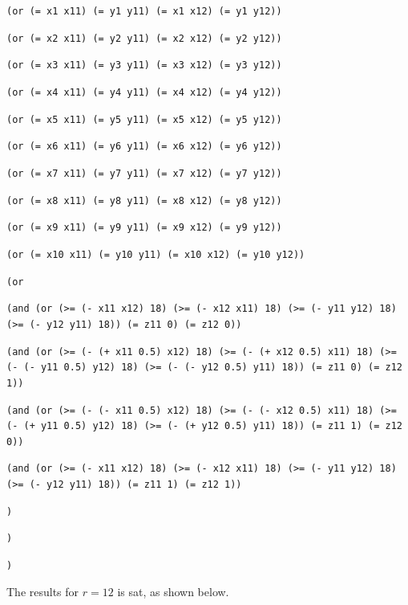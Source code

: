 \documentclass[12pt]{article}
\begin{document}
{{\tt  }

{\tt (or (= x1 x11) (= y1 y11) (= x1 x12) (= y1 y12)) }

{\tt (or (= x2 x11) (= y2 y11) (= x2 x12) (= y2 y12)) }

{\tt (or (= x3 x11) (= y3 y11) (= x3 x12) (= y3 y12)) }

{\tt (or (= x4 x11) (= y4 y11) (= x4 x12) (= y4 y12)) }

{\tt (or (= x5 x11) (= y5 y11) (= x5 x12) (= y5 y12)) }

{\tt (or (= x6 x11) (= y6 y11) (= x6 x12) (= y6 y12)) }

{\tt (or (= x7 x11) (= y7 y11) (= x7 x12) (= y7 y12)) }

{\tt (or (= x8 x11) (= y8 y11) (= x8 x12) (= y8 y12)) }

{\tt (or (= x9 x11) (= y9 y11) (= x9 x12) (= y9 y12)) }

{\tt (or (= x10 x11) (= y10 y11) (= x10 x12) (= y10 y12)) }

{\tt  }

{\tt (or }

{\tt (and (or (>= (- x11 x12) 18) (>= (- x12 x11) 18) (>= (- y11 y12) 18) (>= (- y12 y11) 18)) (= z11 0) (= z12 0)) }

{\tt (and (or (>= (- (+ x11 0.5) x12) 18) (>= (- (+ x12 0.5) x11) 18) (>= (- (- y11 0.5) y12) 18) (>= (- (- y12 0.5) y11) 18)) (= z11 0) (= z12 1)) }

{\tt (and (or (>= (- (- x11 0.5) x12) 18) (>= (- (- x12 0.5) x11) 18) (>= (- (+ y11 0.5) y12) 18) (>= (- (+ y12 0.5) y11) 18)) (= z11 1) (= z12 0)) }

{\tt (and (or (>= (- x11 x12) 18) (>= (- x12 x11) 18) (>= (- y11 y12) 18) (>= (- y12 y11) 18)) (= z11 1) (= z12 1)) }

{\tt ) }

{\tt  }

{\tt  }

{\tt ) }

{\tt ) }
}
The results for $r=12$ is sat, as shown below.
\end{document}
